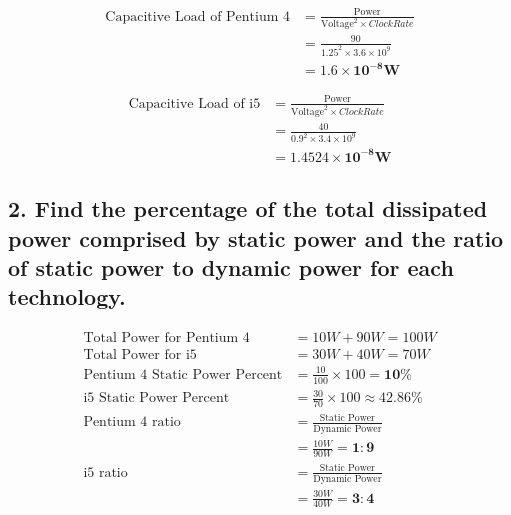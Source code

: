 \documentclass[11pt]{article}
\begin{document}
\begin{align*}
\textrm{Capacitive Load of Pentium 4} & = \frac{\textrm{Power}}{{\textrm{Voltage}}^2 \times Clock Rate} \\
& = \frac{ 90 }{{1.25}^2 \times 3.6 \times 10^9}\\
& = \boldsymbol{1.6 \times 10^{-8} W} 
\end{align*}

\begin{align*}
\textrm{Capacitive Load of i5} & = \frac{\textrm{Power}}{{\textrm{Voltage}}^2 \times Clock Rate} \\
& = \frac{40}{{0.9}^2 \times 3.4 \times 10^9}\\
& = \boldsymbol{1.4524 \times 10^{-8} W} 
\end{align*}

\subsection*{\small 2. Find the percentage of the total dissipated power comprised by static power and the ratio of static power to dynamic power for each technology.}

\begin{align*}
\textrm{Total Power for Pentium 4} & = 10W + 90W = 100W\\
\textrm{Total Power for i5} & = 30W + 40W = 70W\\
\textrm{Pentium 4 Static Power Percent} & = \frac{10}{100} \times 100 = \boldsymbol{10\%} \\
\textrm{i5 Static Power Percent} & = \frac{30}{70} \times 100 \approx \boldsymbol{42.86\%} \\
\textrm{Pentium 4 ratio} & = \frac{\textrm{Static Power}}{\textrm{Dynamic Power}} \\
& = \frac{10W}{90W} = \boldsymbol{1:9}\\
\textrm{i5 ratio} & = \frac{\textrm{Static Power}}{\textrm{Dynamic Power}} \\
& = \frac{30W}{40W} = \boldsymbol{3:4}
\end{align*}
\end{document}
